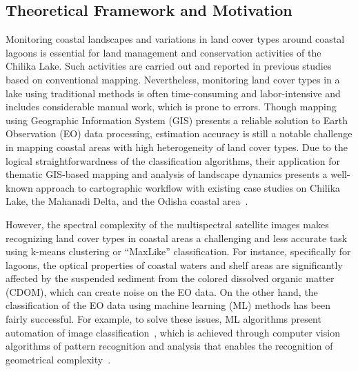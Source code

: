 \documentclass[jmse,article,accept,pdftex,oneauthor]{Definitions/mdpi}
\begin{document}
\subsection{Theoretical Framework and Motivation}
Monitoring coastal landscapes and variations in land cover types around coastal lagoons is essential for land management and conservation activities of the Chilika Lake. Such activities are carried out and reported in previous studies based on conventional mapping. Nevertheless, monitoring land cover types in a lake using traditional methods is often time-consuming and labor-intensive and includes considerable manual work, which is prone to errors. Though mapping using Geographic Information System (GIS) presents a reliable solution to Earth Observation (EO) data processing, estimation accuracy is still a notable challenge in mapping coastal areas with high heterogeneity of land cover types. Due to the logical straightforwardness of the classification algorithms, their application for thematic GIS-based mapping and analysis of landscape dynamics presents a well-known approach to cartographic workflow with existing case studies on Chilika Lake, the Mahanadi Delta, and the Odisha coastal area~\cite{G2019595,MISHRA2023162488,REDDY2014287,HAZRA2022100223}. 

However, the spectral complexity of the multispectral satellite images makes recognizing land cover types in coastal areas a challenging and less accurate task using k-means clustering or ``MaxLike'' classification. For instance, specifically for lagoons, the optical properties of coastal waters and shelf areas are significantly affected by the suspended sediment from the colored dissolved organic matter (CDOM), which can create noise on the EO data. On the other hand, the classification of the EO data using machine learning (ML) methods has been fairly successful. For example, to solve these issues, ML algorithms present automation of image classification~\cite{6049966,9297369}, which is achieved through computer vision algorithms of pattern recognition and analysis that enables the recognition of geometrical complexity~\cite{990132}. 
\end{document}
